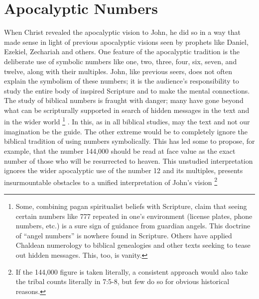 \backmatter
\appendix
\appendixpage
\onecolumn
\setcounter{footnote}{0}
\chapter*{Apocalyptic Numbers}
\fancyhead{} %

When Christ revealed the apocalyptic vision to John, he did so in a way that made sense in light of previous 
apocalyptic visions seen by prophets like Daniel, Ezekiel, Zechariah and others. One feature of the apocalyptic 
tradition is the deliberate use of symbolic numbers like one, two, three, four, six, seven, and twelve, along with their multiples. 
John, like previous seers, does not often explain the symbolism of these numbers; it is the audience's 
responsibility to study the entire body of inspired Scripture and to make the mental connections. 
\newline\newline
The study of biblical numbers is fraught with danger; many have gone beyond what can be scripturally supported in search of hidden messages in the text and in the wider world%
\footnote{Some, combining pagan spiritualist beliefs with Scripture, claim that seeing certain numbers like 777 repeated in one's environment (license plates, phone numbers, etc.) is a sure sign of guidance from guardian angels. This doctrine of ``angel numbers'' is nowhere found in Scripture. Others have applied Chaldean numerology to biblical genealogies and other texts seeking to tease out hidden messages. This, too, is vanity.}%
. In this, as in all biblical studies, may the text and not our imagination be the guide. The other extreme would be to completely ignore the biblical tradition of using numbers symbolically. This has led some to propose, for example, that the number 144,000 should be read at face value as the exact number of those who will be resurrected to heaven. This unstudied interpretation ignores the wider apocalyptic use of the number 12 and its multiples, presents insurmountable obstacles to a unified interpretation of John's vision%
\footnote{If the 144,000 figure is taken literally, a consistent approach would also take the tribal counts literally in 7:5-8, but few do so for obvious historical reasons.} %
